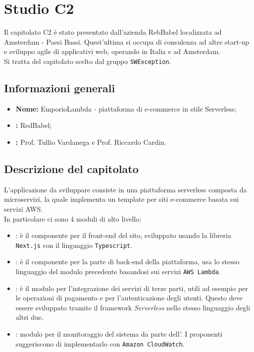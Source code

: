 \section{Studio C2}
Il capitolato C2 è stato presentato dall'azienda RebBabel localizzata ad Amsterdam - Paesi Bassi. Quest'ultima si occupa di consulenza ad altre start-up e sviluppo agile di applicativi web, operando in Italia e ad Amsterdam.\\
Si tratta del capitolato scelto dal gruppo \verb|SWException|.

\subsection{Informazioni generali}
\begin{itemize}
	\item \textbf{Nome:} EmporioLambda - piattaforma di e-commerce in stile Serverless;
	\item \textbf{:} RedBabel;
	\item \textbf{:} Prof. Tullio Vardanega e Prof. Riccardo Cardin.
\end{itemize}

\subsection{Descrizione del capitolato}
L'applicazione da sviluppare consiste in una piattaforma serverless composta da microservizi, la quale implementa un template per siti e-commerce basata sui servizi AWS.\\
In particolare ci sono 4 moduli di alto livello:
\begin{itemize}
	\item {}: è il componente per il front-end del sito, sviluppato usando la libreria \verb|Next.js| con il linguaggio \verb|Typescript|.
	\item {}: è il componente per la parte di back-end della piattaforma, usa lo stesso linguaggio del modulo precedente basandosi sui servizi \verb|AWS Lambda|.
	\item {}: è il modulo per l'integrazione dei servizi di terze parti, utili ad esempio per le operazioni di pagamento e per l'autenticazione degli utenti. Questo deve essere sviluppato tramite il framework \textit{Serverless} nello stesso linguaggio degli altri due.
	\item {}: modulo per il monitoraggio del sistema da parte dell'. I proponenti suggeriscono di implementarlo con \verb|Amazon CloudWatch|.
\end{itemize}

